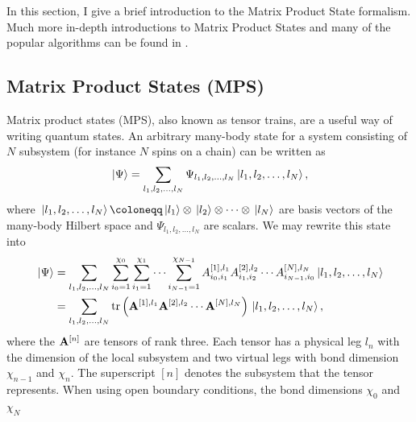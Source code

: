 \def\textoffsetVertical{0.8}
\def\nodewidth{0.6cm}
\def\legwidth{0.8}
\def\nodedistance{1.5}
\def\textoffsetVerticalW{0.9}
\def\textoffsetHorizontalW{-0.9}
\def\textoffsetVerticalMPO{1.2}
\def\yoffset{1}
\def\xoffset{3}
\def\resultMPSYoffset{2.5}
%
In this section, I give a brief introduction to the Matrix Product State formalism. Much more in-depth introductions to Matrix
Product States and many of the popular algorithms can be found in \cite{Schollwöck:2011,Hauschild:2018}.
\subsection*{Matrix Product States (MPS)}
Matrix product states (MPS), also known as tensor trains, are a useful way of writing quantum states. 
An arbitrary many-body state for a system consisting of $N$ subsystem (for instance $N$ spins on a chain) can be written as
\begin{equation*}
    \ket*{\Psi} = \sum_{l_1, l_2, \dots, l_N} \Psi_{l_1, l_2, \dots, l_N} \ket*{l_1, l_2, \dots, l_N},
\end{equation*}
where $\ket*{l_1, l_2, \dots, l_N} \coloneqq \ket*{l_1} \otimes \ket*{l_2} \otimes \cdots \otimes \ket*{l_N}$ are basis vectors
of the many-body Hilbert space and $\Psi_{l_1, l_2, \dots, l_N}$ are scalars. We may rewrite this state into
\begin{equation}
    \label{eq:mps}
    \begin{split}
        \ket*{\Psi} &= \sum_{l_1, l_2, \dots, l_N} \sum_{i_0 = 1}^{\chi_0} \sum_{i_1 = 1}^{\chi_1} \cdots \sum_{i_{N-1} = 1}^{\chi_{N-1}} A_{i_0, i_1}^{[1], l_1} A_{i_1, i_2}^{[2], l_2}\cdots A_{i_{N-1}, i_0}^{[N], l_N} \ket*{l_1, l_2, \dots, l_N} \\
                    &= \sum_{l_1, l_2, \dots, l_N} \trace\left(
                        \vectorbold{A}^{[1],l_1} \vectorbold{A}^{[2],l_2} \cdots \vectorbold{A}^{[N],l_N}
                        \right) \ket*{l_1, l_2, \dots, l_N},
    \end{split}
\end{equation}
where the $\vectorbold{A}^{[n]}$ are tensors of rank three. Each tensor has a physical leg $l_n$ with the dimension of the local subsystem
and two virtual legs with bond dimension $\chi_{n-1}$ and $\chi_{n}$. The superscript $[n]$ denotes the subsystem that the tensor represents.
When using open boundary conditions, the bond dimensions $\chi_{0}$ and $\chi_{N}$

